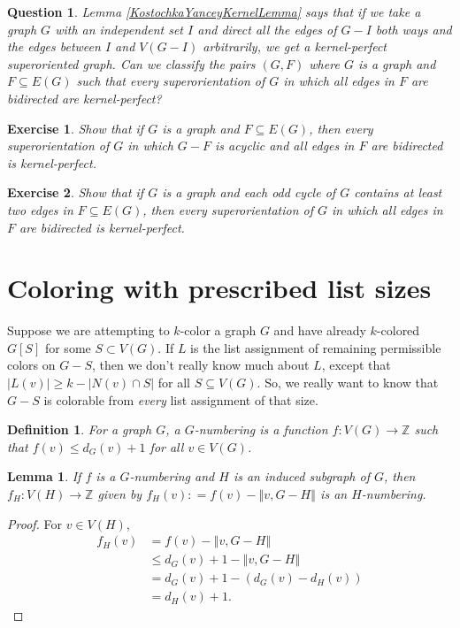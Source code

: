 \documentclass[openany]{tufte-book} %
\theoremstyle{plain}
\newtheorem{definition}{Definition}
\newtheorem{exercise}{Exercise}
\newtheorem{lemma}{Lemma}
\newtheorem{question}{Question}
\newcommand{\card}[1]{\left|#1\right|}
\newcommand{\size}[1]{\left\Vert#1\right\Vert}
\newcommand{\func}[3]{#1\colon #2 \rightarrow #3}
\newcommand{\DefinedAs}{\mathrel{\mathop:}=}
\newcommand{\IZ}{\mathbb{Z}}
\begin{document}
\begin{question}\label{KernelPerfectQuestion}
Lemma \ref{KostochkaYanceyKernelLemma} says that if we take a graph $G$ with an independent set $I$ and direct all the edges of $G-I$ both ways and the edges 
between $I$ and $V(G-I)$ arbitrarily, we get a kernel-perfect superoriented graph.  Can we classify the pairs $(G, F)$ where $G$ is a graph and $F \subseteq E(G)$ such that
every superorientation of $G$ in which all edges in $F$ are bidirected are kernel-perfect? 
\end{question}

\begin{exercise}
Show that if $G$ is a graph and $F \subseteq E(G)$, then
every superorientation of $G$ in which $G-F$ is acyclic and all edges in $F$ are bidirected is kernel-perfect.
\end{exercise}

\begin{exercise}
Show that if $G$ is a graph and each odd cycle of $G$ contains at least two edges in $F \subseteq E(G)$, then
every superorientation of $G$ in which all edges in $F$ are bidirected is kernel-perfect.
\end{exercise}

\section{Coloring with prescribed list sizes}
Suppose we are attempting to $k$-color a graph $G$ and have already $k$-colored $G[S]$ for some $S \subset V(G)$.  
If $L$ is the list assignment of remaining permissible colors on $G-S$, then we don't really know much about $L$, except that $\card{L(v)} \ge k - \card{N(v) \cap S}$ for all $S \subseteq V(G)$.
So, we really want to know that $G-S$ is colorable from \emph{every} list assignment of that size.

\begin{definition}
For a graph $G$, a \emph{$G$-numbering} is a function $\func{f}{V(G)}{\IZ}$ such that $f(v) \le d_G(v) + 1$ for all $v \in V(G)$.
\end{definition}

\begin{lemma}
If $f$ is a $G$-numbering and $H$ is an induced subgraph of $G$, then $\func{f_H}{V(H)}{\IZ}$ given by $f_H(v) \DefinedAs f(v) - \size{v, G-H}$ is an $H$-numbering.
\end{lemma}
\begin{proof}
For $v \in V(H)$,
\begin{align*}
f_H(v) &= f(v) - \size{v, G-H} \\
&\le d_G(v) + 1 - \size{v, G-H}\\
&= d_G(v) + 1 - (d_G(v) - d_H(v)) \\
&= d_H(v) + 1.
\end{align*}
\end{proof}
\end{document}
